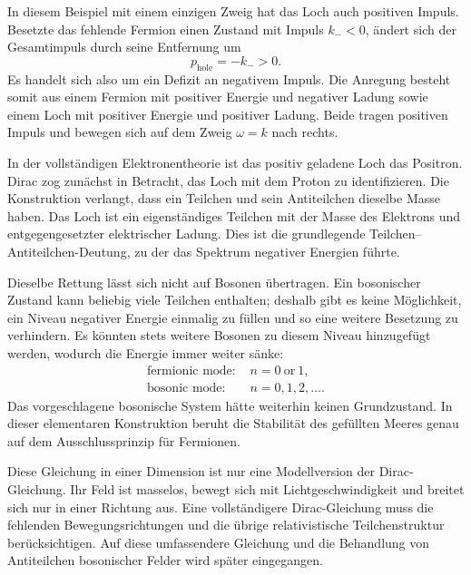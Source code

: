 In diesem Beispiel mit einem einzigen Zweig hat das Loch auch positiven Impuls. Besetzte das fehlende Fermion einen Zustand mit Impuls \(k_-<0\), ändert sich der Gesamtimpuls durch seine Entfernung um
\begin{equation}
p_{\mathrm{hole}}=-k_->0.
\end{equation}
Es handelt sich also um ein Defizit an negativem Impuls. Die Anregung besteht somit aus einem Fermion mit positiver Energie und negativer Ladung sowie einem Loch mit positiver Energie und positiver Ladung. Beide tragen positiven Impuls und bewegen sich auf dem Zweig \(\omega=k\) nach rechts.

In der vollständigen Elektronentheorie ist das positiv geladene Loch das Positron. Dirac zog zunächst in Betracht, das Loch mit dem Proton zu identifizieren. Die Konstruktion verlangt, dass ein Teilchen und sein Antiteilchen dieselbe Masse haben. Das Loch ist ein eigenständiges Teilchen mit der Masse des Elektrons und entgegengesetzter elektrischer Ladung. Dies ist die grundlegende Teilchen--Antiteilchen-Deutung, zu der das Spektrum negativer Energien führte.

Dieselbe Rettung lässt sich nicht auf Bosonen übertragen. Ein bosonischer Zustand kann beliebig viele Teilchen enthalten; deshalb gibt es keine Möglichkeit, ein Niveau negativer Energie einmalig zu füllen und so eine weitere Besetzung zu verhindern. Es könnten stets weitere Bosonen zu diesem Niveau hinzugefügt werden, wodurch die Energie immer weiter sänke:
\begin{equation}
\begin{aligned}
\text{fermionic mode: }&n=0\ \text{or}\ 1,\\
\text{bosonic mode: }&n=0,1,2,\ldots .
\end{aligned}
\end{equation}
Das vorgeschlagene bosonische System hätte weiterhin keinen Grundzustand. In dieser elementaren Konstruktion beruht die Stabilität des gefüllten Meeres genau auf dem Ausschlussprinzip für Fermionen.

Diese Gleichung in einer Dimension ist nur eine Modellversion der Dirac-Gleichung. Ihr Feld ist masselos, bewegt sich mit Lichtgeschwindigkeit und breitet sich nur in einer Richtung aus. Eine vollständigere Dirac-Gleichung muss die fehlenden Bewegungsrichtungen und die übrige relativistische Teilchenstruktur berücksichtigen. Auf diese umfassendere Gleichung und die Behandlung von Antiteilchen bosonischer Felder wird später eingegangen.
